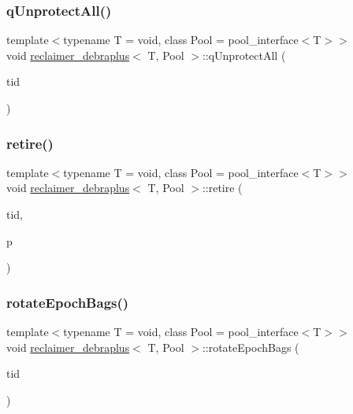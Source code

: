 \subsubsection{\texorpdfstring{q\+Unprotect\+All()}{qUnprotectAll()}}
{\footnotesize\ttfamily template$<$typename T  = void, class Pool  = pool\+\_\+interface$<$\+T$>$$>$ \\
void \hyperlink{classreclaimer__debraplus}{reclaimer\+\_\+debraplus}$<$ T, Pool $>$\+::q\+Unprotect\+All (\begin{DoxyParamCaption}\item[{const int}]{tid }\end{DoxyParamCaption})\hspace{0.3cm}{\ttfamily [inline]}}

\mbox{\label{classreclaimer__debraplus_ab9e42e9a1a7a78774f46740ba79a5abe}} 
\subsubsection{\texorpdfstring{retire()}{retire()}}
{\footnotesize\ttfamily template$<$typename T  = void, class Pool  = pool\+\_\+interface$<$\+T$>$$>$ \\
void \hyperlink{classreclaimer__debraplus}{reclaimer\+\_\+debraplus}$<$ T, Pool $>$\+::retire (\begin{DoxyParamCaption}\item[{const int}]{tid,  }\item[{T $\ast$}]{p }\end{DoxyParamCaption})\hspace{0.3cm}{\ttfamily [inline]}}

\mbox{\label{classreclaimer__debraplus_abd86bc4bf14e52867a2fc6bdfa4f2887}} 
\subsubsection{\texorpdfstring{rotate\+Epoch\+Bags()}{rotateEpochBags()}}
{\footnotesize\ttfamily template$<$typename T  = void, class Pool  = pool\+\_\+interface$<$\+T$>$$>$ \\
void \hyperlink{classreclaimer__debraplus}{reclaimer\+\_\+debraplus}$<$ T, Pool $>$\+::rotate\+Epoch\+Bags (\begin{DoxyParamCaption}\item[{const int}]{tid }\end{DoxyParamCaption})\hspace{0.3cm}{\ttfamily [inline]}}

